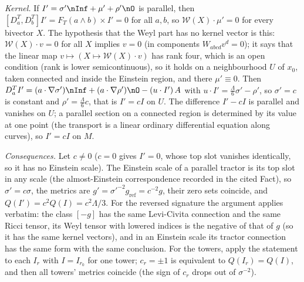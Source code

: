 \emph{Kernel.} If $I' = \sigma'\nInf + \mu' + \rho'\nO$ is parallel, then $[D^{T}_{a}, D^{T}_{b}]I' = F_{T}(a\wedge b)\times I' = 0$ for all $a, b$, so $\mathcal{W}(X)\cdot\mu' = 0$ for every bivector $X$. The hypothesis that the Weyl part has no kernel vector is this: $\mathcal{W}(X)\cdot v = 0$ for all $X$ implies $v = 0$ (in components $W_{abcd}v^{d} = 0$); it says that the linear map $v \mapsto (X \mapsto \mathcal{W}(X)\cdot v)$ has rank four, which is an open condition (rank is lower semicontinuous), so it holds on a neighbourhood $U$ of $x_{0}$, taken connected and inside the Einstein region, and there $\mu' \equiv 0$. Then $D^{T}_{a}I' = (a\cdot\nabla\sigma')\nInf + (a\cdot\nabla\rho')\nO - (u\cdot I')\,A$ with $u\cdot I' = \tfrac{\Lambda}{6}\sigma' - \rho'$, so $\sigma' = c$ is constant and $\rho' = \tfrac{\Lambda}{6}c$, that is $I' = cI$ on $U$. The difference $I' - cI$ is parallel and vanishes on $U$; a parallel section on a connected region is determined by its value at one point (the transport is a linear ordinary differential equation along curves), so $I' = cI$ on $M$.

\emph{Consequences.} Let $c \neq 0$ ($c = 0$ gives $I' = 0$, whose top slot vanishes identically, so it has no Einstein scale). The Einstein scale of a parallel tractor is its top slot in any scale (the almost-Einstein correspondence recorded in the cited Fact), so $\sigma' = c\sigma$, the metrics are $g' = \sigma'^{-2}g_{\text{ref}} = c^{-2} g$, their zero sets coincide, and $Q(I') = c^2Q(I) = c^2\Lambda/3$. For the reversed signature the argument applies verbatim: the class $[-g]$ has the same Levi-Civita connection and the same Ricci tensor, its Weyl tensor with lowered indices is the negative of that of $g$ (so it has the same kernel vectors), and in an Einstein scale its tractor connection has the same form with the same conclusion. For the towers, apply the statement to each $I_r$ with $I = I_{r_0}$ for one tower; $c_r = \pm 1$ is equivalent to $Q(I_r) = Q(I)$, and then all towers' metrics coincide (the sign of $c_r$ drops out of $\sigma^{-2}$).

